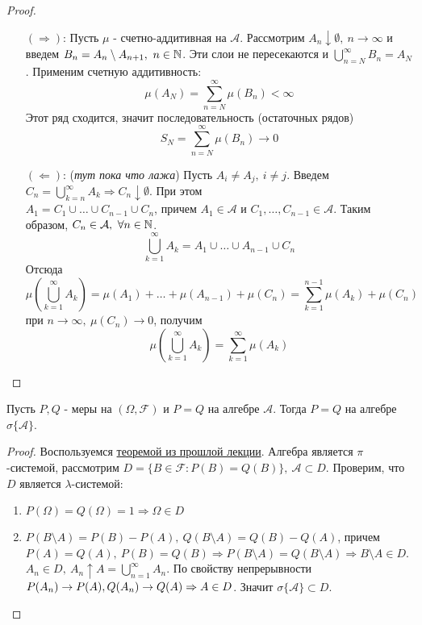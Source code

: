 \documentclass[a4paper, 12pt]{article}
\begin{document}
\begin{proof}\tab
    \begin{itemize}
        \item[$(\Rightarrow)$:]
        Пусть $\mu$ - счетно-аддитивная на $\mathcal{A}$. Рассмотрим $A_n \downarrow \emptyset,\ n\to \infty$ и введем $B_n=A_n\setminus A_{n+1},\ n\in \mathbb{N}$. Эти слои не пересекаются и $\bigcup\limits_{n=N}^{\infty}B_n=A_N$. Применим счетную аддитивность: 
        \[\mu(A_N)=\sum\limits_{n=N}^{\infty}\mu(B_n)<\infty\]
        Этот ряд сходится, значит последовательность (остаточных рядов)
        \[S_N=\sum\limits_{n=N}^{\infty}\mu(B_n)\to 0\]
        \item[$(\Leftarrow)$:] (\textit{тут пока что лажа})
        Пусть $A_i\ne A_j,\ i\ne j$. Введем $C_n=\bigcup\limits_{k=n}^{\infty}A_k \Rightarrow C_n \downarrow \emptyset$. При этом \\
        $A_1=C_1\cup\dots\cup C_{n-1}\cup C_n$, причем $A_1\in \mathcal{A}$ и $C_1,\dots,C_{n-1}\in \mathcal{A}$. Таким образом, $C_n\in \mathcal{A},\ \forall n\in \mathbb{N}$. 
        \[\bigcup\limits_{k=1}^{\infty}A_k=A_1\cup\dots\cup A_{n-1}\cup C_n\]
        Отсюда
        \[\mu\left(\bigcup\limits_{k=1}^{\infty}A_k\right)=\mu(A_1)+ \dots +\mu(A_{n-1})+\mu(C_n)=\sum\limits_{k=1}^{n-1}\mu(A_k)+\mu(C_n)\]
        при $n\to \infty,\ \mu(C_n)\to 0$, получим 
        \[\mu\left(\bigcup\limits_{k=1}^{\infty}A_k\right)=\sum\limits_{k=1}^{\infty}\mu(A_k)\]
    \end{itemize}
\end{proof}
\begin{theorem}
    Пусть $P, Q$ - меры на $(\Omega, \mathcal{F})$ и $P=Q$ на алгебре $\mathcal{A}$. Тогда $P=Q$ на алгебре $\sigma\{\mathcal{A}\}$.
\end{theorem}
\begin{proof}
    Воспользуемся \hyperref[th1]{теоремой из прошлой лекции}. Алгебра является $\pi$-системой, рассмотрим $D=\{B\in \mathcal{F}: P(B)=Q(B)\},\ \mathcal{A}\subset D$. Проверим, что $D$ является $\lambda$-системой:
    \begin{enumerate}
        \item $P(\Omega)=Q(\Omega)=1 \Rightarrow \Omega\in D$
        \item $P(B\setminus A)=P(B)-P(A),\ Q(B\setminus A)=Q(B)-Q(A)$, причем\\
        $P(A)=Q(A),\ P(B)=Q(B) \Rightarrow P(B\setminus A)=Q(B\setminus A) \Rightarrow B\setminus A\in D$.
        $A_n\in D,\ A_n \uparrow A=\bigcup\limits_{n=1}^{\infty}A_n$. По свойству непрерывности $P(A_n)\to P(A),\\
        Q(A_n)\to Q(A) \Rightarrow A\in D$.
        Значит $\sigma\{\mathcal{A}\}\subset D$.
    \end{enumerate}
\end{proof}
\end{document}
